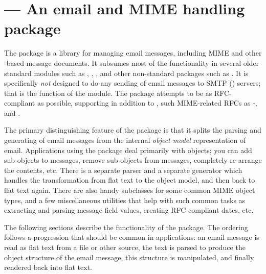
\section{ ---
	 An email and MIME handling package}



The  package is a library for managing email messages,
including MIME and other -based message documents.  It
subsumes most of the functionality in several older standard modules
such as , ,
, and other non-standard packages such as
.  It is specifically \emph{not} designed to do any
sending of email messages to SMTP () servers; that is the
function of the  module.  The 
package attempts to be as RFC-compliant as possible, supporting in
addition to , such MIME-related RFCs as
-, and .

The primary distinguishing feature of the  package is
that it splits the parsing and generating of email messages from the
internal \emph{object model} representation of email.  Applications
using the  package deal primarily with objects; you can
add sub-objects to messages, remove sub-objects from messages,
completely re-arrange the contents, etc.  There is a separate parser
and a separate generator which handles the transformation from flat
text to the object model, and then back to flat text again.  There
are also handy subclasses for some common MIME object types, and a few
miscellaneous utilities that help with such common tasks as extracting
and parsing message field values, creating RFC-compliant dates, etc.

The following sections describe the functionality of the
 package.  The ordering follows a progression that
should be common in applications: an email message is read as flat
text from a file or other source, the text is parsed to produce the
object structure of the email message, this structure is manipulated,
and finally rendered back into flat text.

